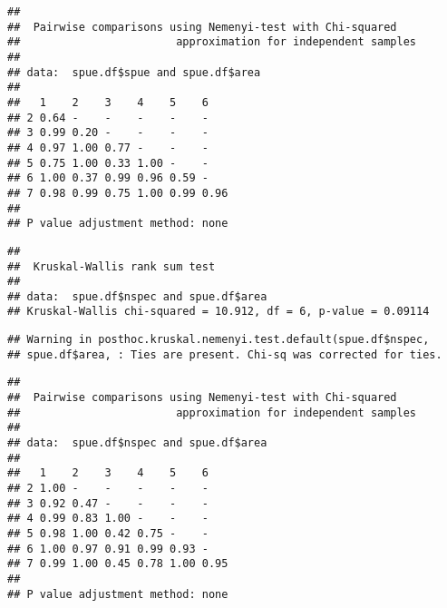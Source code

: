 \documentclass[]{article}
\newenvironment{Shaded}{\begin{snugshade}}{\end{snugshade}}
\newcommand{\KeywordTok}[1]{\textcolor[rgb]{0.13,0.29,0.53}{\textbf{#1}}}
\newcommand{\StringTok}[1]{\textcolor[rgb]{0.31,0.60,0.02}{#1}}
\newcommand{\CommentTok}[1]{\textcolor[rgb]{0.56,0.35,0.01}{\textit{#1}}}
\newcommand{\OperatorTok}[1]{\textcolor[rgb]{0.81,0.36,0.00}{\textbf{#1}}}
\newcommand{\NormalTok}[1]{#1}
\begin{document}
\begin{verbatim}
## 
##  Pairwise comparisons using Nemenyi-test with Chi-squared    
##                        approximation for independent samples 
## 
## data:  spue.df$spue and spue.df$area 
## 
##   1    2    3    4    5    6   
## 2 0.64 -    -    -    -    -   
## 3 0.99 0.20 -    -    -    -   
## 4 0.97 1.00 0.77 -    -    -   
## 5 0.75 1.00 0.33 1.00 -    -   
## 6 1.00 0.37 0.99 0.96 0.59 -   
## 7 0.98 0.99 0.75 1.00 0.99 0.96
## 
## P value adjustment method: none
\end{verbatim}

\begin{Shaded}
\end{Shaded}

\begin{verbatim}
## 
##  Kruskal-Wallis rank sum test
## 
## data:  spue.df$nspec and spue.df$area
## Kruskal-Wallis chi-squared = 10.912, df = 6, p-value = 0.09114
\end{verbatim}

\begin{Shaded}
\end{Shaded}

\begin{verbatim}
## Warning in posthoc.kruskal.nemenyi.test.default(spue.df$nspec,
## spue.df$area, : Ties are present. Chi-sq was corrected for ties.
\end{verbatim}

\begin{verbatim}
## 
##  Pairwise comparisons using Nemenyi-test with Chi-squared    
##                        approximation for independent samples 
## 
## data:  spue.df$nspec and spue.df$area 
## 
##   1    2    3    4    5    6   
## 2 1.00 -    -    -    -    -   
## 3 0.92 0.47 -    -    -    -   
## 4 0.99 0.83 1.00 -    -    -   
## 5 0.98 1.00 0.42 0.75 -    -   
## 6 1.00 0.97 0.91 0.99 0.93 -   
## 7 0.99 1.00 0.45 0.78 1.00 0.95
## 
## P value adjustment method: none
\end{verbatim}
\end{document}

